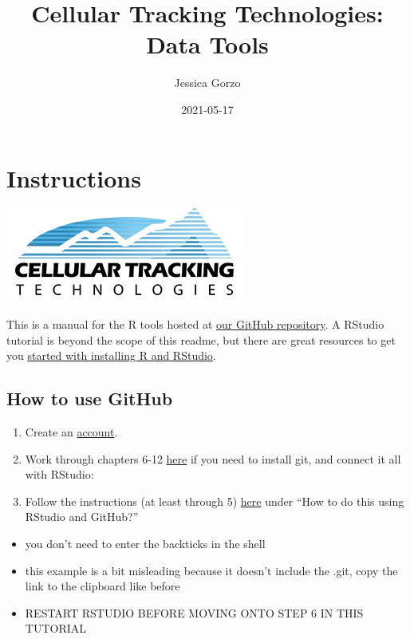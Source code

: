 \documentclass[
]{book}
\title{Cellular Tracking Technologies: Data Tools}
\author{Jessica Gorzo}
\date{2021-05-17}
\providecommand{\tightlist}{%
  \setlength{\itemsep}{0pt}\setlength{\parskip}{0pt}}
\begin{document}
\maketitle

{
\setcounter{tocdepth}{1}
\tableofcontents
}
\hypertarget{instructions}{%
\chapter*{Instructions}\label{instructions}}

\includegraphics{bookdown-demo_files/figure-html/unnamed.png}

This is a manual for the R tools hosted at \href{https://github.com/cellular-tracking-technologies/data_tools}{our GitHub repository}. A RStudio tutorial is beyond the scope of this readme, but there are great resources to get you \href{https://www.earthdatascience.org/courses/earth-analytics/document-your-science/setup-r-rstudio/}{started with installing R and RStudio}.

\hypertarget{how-to-use-github}{%
\section*{How to use GitHub}\label{how-to-use-github}}

\begin{enumerate}
\def\labelenumi{\arabic{enumi}.}
\tightlist
\item
  Create an \href{https://github.com}{account}.
\item
  Work through chapters 6-12 \href{https://happygitwithr.com/install-git.html}{here} if you need to install git, and connect it all with RStudio:
\item
  Follow the instructions (at least through 5) \href{https://r-bio.github.io/intro-git-rstudio/}{here} under ``How to do this using RStudio and GitHub?''
\end{enumerate}

\begin{itemize}
\tightlist
\item
  you don't need to enter the backticks in the shell
\item
  this example is a bit misleading because it doesn't include the .git, copy the link to the clipboard like before
\item
  RESTART RSTUDIO BEFORE MOVING ONTO STEP 6 IN THIS TUTORIAL
\end{itemize}
\end{document}
